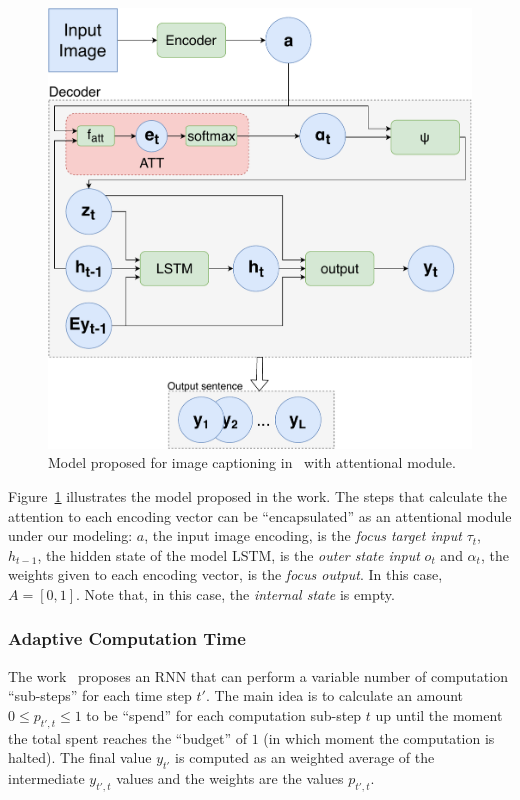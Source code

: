 \documentclass[12pt]{article}
\begin{document}
\begin{figure}[H]
    \centering
    \includegraphics[width=0.6\linewidth]{./img/captioning.pdf}
    \caption{Model proposed for image captioning in~\cite{ref:show-attend-tell} with attentional module.}
\label{fig:cap}
\end{figure}

Figure~\ref{fig:cap} illustrates the model proposed in the work.
The steps that calculate the attention to each encoding vector can be ``encapsulated'' as
an attentional module under our modeling:
$a$, the input image encoding, is the \emph{focus target input} $\tau_t$,
$h_{t-1}$, the hidden state of the model LSTM, is the \emph{outer state input} $o_t$
and $\alpha_t$, the weights given to each encoding vector, is the \emph{focus output}. In this case, $A = [0, 1]$.
Note that, in this case, the \emph{internal state} is empty.

\subsubsection{Adaptive Computation Time}
The work~\cite{ref:act} proposes an RNN that can perform a variable number of computation ``sub-steps'' for each time step $t'$.
The main idea is to calculate an amount $0 \le p_{t',t} \le 1$ to be ``spend'' for each computation sub-step $t$ up until the
moment the total spent reaches the ``budget'' of $1$ (in which moment the computation is halted).
The final value $y_{t'}$ is computed as an weighted average of the intermediate $y_{t',t}$ values and the weights are the values
$p_{t',t}$.
\end{document}
